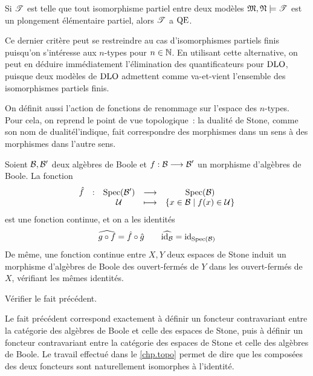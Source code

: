 \begin{corollary}
  Si $\mathscr T$ est telle que tout isomorphisme partiel entre deux modèles
  $\mathfrak{M},\mathfrak{N}\models\mathscr T$ est un plongement élémentaire partiel, alors
  $\mathscr T$ a $\operatorname{QE}$.
\end{corollary}

\begin{remark}
  Ce dernier critère peut se restreindre au cas d'isomorphismes partiels
  finis puisqu'on s'intéresse aux $n$-types pour $n\in\mathbb N$. En utilisant cette
  alternative, on peut en déduire immédiatement l'élimination des
  quantificateurs pour $\operatorname{DLO}$, puisque deux modèles de $\operatorname{DLO}$ admettent comme
  va-et-vient l'ensemble des isomorphismes partiels finis.
\end{remark}

On définit aussi l'action de fonctions de renommage sur l'espace des $n$-types.
Pour cela, on reprend le point de vue topologique~: la dualité de Stone, comme
son nom de \og dualité\fg l'indique, fait correspondre des morphismes dans un
sens à des morphismes dans l'autre sens.

\begin{claim}
  Soient $\mathcal{B},\mathcal{B}'$ deux algèbres de Boole et
  $f : \displaystyle \mathcal{B} \longrightarrow \mathcal{B}'$ un morphisme d'algèbres de Boole.
  La fonction
  \[\makeFun{\relev{f}}{\Spec(\varBB')}{\Spec(\varBB)}
            {\varUlF}{\compr{x \in \varBB}{f(x)\in\varUlF}}\]
  est une fonction continue, et on a les identités
  \[\widehat{g\circ f} =\hat{f}\circ\hat{g} \qquad
  \widehat{\operatorname{id}_{\mathcal{B}}} = \operatorname{id}_{\operatorname{Spec}(\mathcal{B})}\]
  De même, une fonction continue entre $X,Y$ deux espaces de Stone induit un
  morphisme d'algèbres de Boole des ouvert-fermés de $Y$ dans les ouvert-fermés
  de $X$, vérifiant les mêmes identités.
\end{claim}

\begin{exercise}
  Vérifier le fait précédent.
\end{exercise}

\begin{remark}
  Le fait précédent correspond exactement à définir un foncteur contravariant
  entre la catégorie des algèbres de Boole et celle des espaces de Stone, puis
  à définir un foncteur contravariant entre la catégorie des espaces de Stone et
  celle des algèbres de Boole. Le travail effectué dans le \cref{chp.topo}
  permet de dire que les composées des deux foncteurs sont naturellement
  isomorphes à l'identité.
\end{remark}

